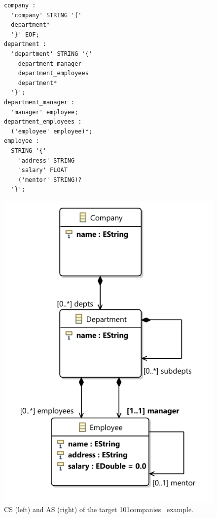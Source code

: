 \documentclass{llncs}
\makeatletter
\newenvironment{SubFloat}[2][]%
{\def\sf@one{#1}%
	\def\sf@two{#2}%
	\setbox\sf@box\hbox%
	\bgroup}%
{ \egroup%
	\ifx\@empty\sf@two\@empty\relax%
	\def\sf@two{\@empty}%
	\fi%
	\ifx\@empty\sf@one\@empty\relax%
	\subfloat[\sf@two]{\box\sf@box}%
	\else%
	\subfloat[\sf@one][\sf@two]{\box\sf@box}%
	\fi%
}%
\makeatother
\begin{document}
\begin{figure}[htbp]
   \captionsetup[subfigure]{labelformat=empty}
   \begin{SubFloat}[]{}
     \begin{minipage}{.5\textwidth}
		\begin{lstlisting}[label=lst:CompaniesCS, language=Xtext]
company :
  'company' STRING '{' 
  department* 
  '}' EOF;
department :
  'department' STRING '{' 
    department_manager
	department_employees
	department*
  '}';
department_manager :
  'manager' employee;
department_employees :
  ('employee' employee)*;
employee :
  STRING '{'
    'address' STRING
    'salary' FLOAT
    ('mentor' STRING)?
  '}';
		\end{lstlisting} 
      \end{minipage}
	\end{SubFloat}%
	\begin{SubFloat}{}
		\begin{minipage}{.5\textwidth}
		\centering
		\includegraphics[scale=.5]{images/CompanyAS.pdf}
     	\end{minipage}
	\end{SubFloat}
	\caption{CS (left) and AS (right) of the target 101companies~\cite{favre2012101companies} example.}
	\label{fig:CompaniesExample}
\end{figure}
\end{document}
